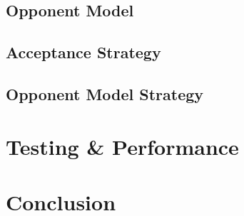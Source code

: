 \documentclass[a4paper,10pt]{article}
\begin{document}
\subsection{Opponent Model}
\label{sec:strategyOM}


\subsection{Acceptance Strategy}
\label{sec:strategyAS}


\subsection{Opponent Model Strategy} 
\label{sec:strategyOMS}


\section{Testing \& Performance}
\label{sec:performance}



\section{Conclusion}
\label{sec:conclusion}




\end{document}
